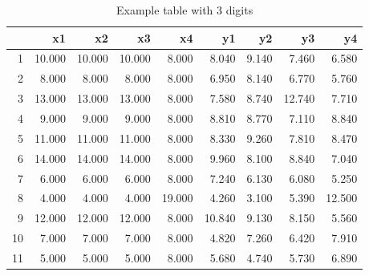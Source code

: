 \documentclass[10pt, fullpage, a4paper, titlepage]{article}
\begin{document}
\begin{table}[ht]
\centering
\begin{tabular}{rrrrrrrrr}
  \hline
 & x1 & x2 & x3 & x4 & y1 & y2 & y3 & y4 \\ 
  \hline
1 & 10.000 & 10.000 & 10.000 & 8.000 & 8.040 & 9.140 & 7.460 & 6.580 \\ 
  2 & 8.000 & 8.000 & 8.000 & 8.000 & 6.950 & 8.140 & 6.770 & 5.760 \\ 
  3 & 13.000 & 13.000 & 13.000 & 8.000 & 7.580 & 8.740 & 12.740 & 7.710 \\ 
  4 & 9.000 & 9.000 & 9.000 & 8.000 & 8.810 & 8.770 & 7.110 & 8.840 \\ 
  5 & 11.000 & 11.000 & 11.000 & 8.000 & 8.330 & 9.260 & 7.810 & 8.470 \\ 
  6 & 14.000 & 14.000 & 14.000 & 8.000 & 9.960 & 8.100 & 8.840 & 7.040 \\ 
  7 & 6.000 & 6.000 & 6.000 & 8.000 & 7.240 & 6.130 & 6.080 & 5.250 \\ 
  8 & 4.000 & 4.000 & 4.000 & 19.000 & 4.260 & 3.100 & 5.390 & 12.500 \\ 
  9 & 12.000 & 12.000 & 12.000 & 8.000 & 10.840 & 9.130 & 8.150 & 5.560 \\ 
  10 & 7.000 & 7.000 & 7.000 & 8.000 & 4.820 & 7.260 & 6.420 & 7.910 \\ 
  11 & 5.000 & 5.000 & 5.000 & 8.000 & 5.680 & 4.740 & 5.730 & 6.890 \\ 
   \hline
\end{tabular}
\caption{Example table with 3 digits} 
\label{ACtable3}
\end{table}
\end{document}
